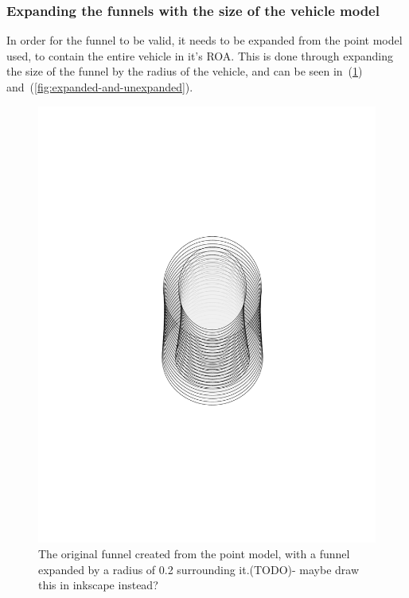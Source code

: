 \subsubsection{Expanding the funnels with the size of the vehicle model}

In order for the funnel to be valid, it needs to be expanded from the point
model used, to contain the entire vehicle in it's \ac{ROA}. This is done through
expanding the size of the funnel by the radius of the vehicle, and can be seen
in~(\ref{fig:expanded-funnel}) and~(\ref{fig:expanded-and-unexpanded}).

\begin{figure}
  \centering \includegraphics[clip, trim=6cm 8cm 6cm 8cm,
  scale=.5]{figures/method/expanded-funnel}
  \caption{The original funnel created from the point model, with a funnel
    expanded by a radius of 0.2 surrounding it.(TODO)- maybe draw this in
    inkscape instead?}
  \label{fig:expanded-funnel}
\end{figure}

